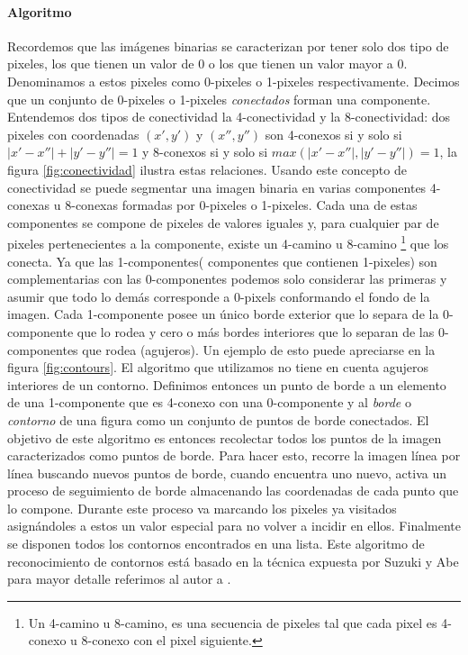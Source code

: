 	\paragraph{Algoritmo} 
	Recordemos que las imágenes binarias se caracterizan por tener solo 
	dos tipo de pixeles, los que tienen un valor de 0 o los que tienen 
	un valor mayor a 0. Denominamos a estos pixeles como 
	0-pixeles o 1-pixeles respectivamente. Decimos que un conjunto de 0-pixeles o 1-pixeles \textit{conectados} forman una componente. Entendemos dos tipos de conectividad
	la 4-conectividad y la 8-conectividad: dos pixeles con coordenadas $(x',y')$ y $(x'',y'')$ son 4-conexos si y solo si 
	$|x' - x''| + |y'-y''| = 1$ y 8-conexos si y solo si $max(|x'-x''|,|y'-y''|)=1$, la figura \ref{fig:conectividad} ilustra estas relaciones.
	Usando este concepto de conectividad se puede segmentar una imagen 
	binaria en varias componentes 4-conexas u 8-conexas formadas por 
	 0-pixeles o 1-pixeles. Cada una de estas
	componentes se compone de pixeles de valores iguales y, para cualquier 
	par de pixeles pertenecientes a la componente, existe un 
	4-camino u 8-camino \footnote{ Un 4-camino u 8-camino, es una secuencia 
	de pixeles tal que cada pixel es 4-conexo u 8-conexo con el pixel 
	siguiente.} que los
	conecta. Ya que las 1-componentes( componentes que contienen 1-pixeles) son complementarias con las 0-componentes podemos solo considerar las primeras y asumir que todo
	lo demás corresponde a 0-pixels conformando el fondo de la imagen. Cada 
	1-componente posee un único borde exterior que lo separa de la 0-componente que lo rodea y cero o más bordes interiores que lo separan de las 0-componentes que rodea (agujeros). Un ejemplo de esto puede apreciarse
	en la figura \ref{fig:contours}. El algoritmo que utilizamos no tiene en cuenta agujeros interiores de un contorno. Definimos entonces un punto de borde a un elemento de una 1-componente que es 4-conexo con una 0-componente y al \textit{borde} o \textit{contorno} de una figura como un conjunto de puntos de borde conectados. 
	El objetivo de este algoritmo es entonces recolectar todos los 
	puntos de la imagen caracterizados como puntos de borde. Para 
	hacer esto, recorre la imagen línea por línea buscando nuevos puntos de borde, cuando encuentra
	uno nuevo, activa un proceso de seguimiento de borde almacenando las 
	coordenadas de cada punto que lo compone. Durante este proceso va 
	marcando los pixeles ya 
	visitados asignándoles a estos un valor especial para no volver a 
	incidir en ellos. Finalmente se disponen todos los contornos encontrados en una lista.
	Este algoritmo de reconocimiento de contornos está basado en la 
	técnica expuesta por Suzuki y Abe para mayor detalle referimos al 
	autor a \cite{suzuki85}.
	
